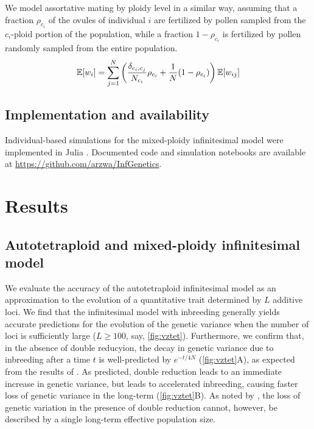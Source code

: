 \documentclass[11pt,a4paper]{article}
\begin{document}
We model assortative mating by ploidy level in a similar way, assuming that a
fraction $\rho_{c_i}$ of the ovules of individual $i$ are fertilized by pollen
sampled from the $c_i$-ploid portion of the population, while a fraction
$1-\rho_{c_i}$ is fertilized by pollen randomly sampled from the entire
population.
\begin{equation}
\mathbb{E}[w_i] = \sum_{j=1}^N \left(\frac{\delta_{c_i,c_j}}{N_{c_i}}\rho_{c_i} +
\frac{1}{N}(1-\rho_{c_i})\right)\mathbb{E}[w_{ij}]
\end{equation}

\subsection*{Implementation and availability}

Individual-based simulations for the mixed-ploidy infinitesimal model were
implemented in Julia \citep{julia}.
Documented code and simulation notebooks are available at
\url{https://github.com/arzwa/InfGenetics}.

\section*{Results}

\subsection*{Autotetraploid and mixed-ploidy infinitesimal model}

We evaluate the accuracy of the autotetraploid infinitesimal model as an
approximation to the evolution of a quantitative trait determined by $L$
additive loci.
We find that the infinitesimal model with inbreeding generally yields accurate
predictions for the evolution of the genetic variance when the number of loci
is sufficiently large ($L \ge 100$, say, \cref{fig:vztet}).
Furthermore, we confirm that, in the absence of double reducyion, the decay in
genetic variance due to inbreeding after a time $t$ is well-predicted by
$e^{-t/4N}$ (\cref{fig:vztet}A), as expected from the results of \cite{arnold2012}.
As predicted, double reduction leads to an immediate increase in genetic
variance, but leads to accelerated inbreeding, causing faster loss of genetic
variance in the long-term (\cref{fig:vztet}B).
As noted by \cite{arnold2012}, the loss of genetic variation in the presence of
double reduction cannot, however, be described by a single long-term effective
population size.
\end{document}
